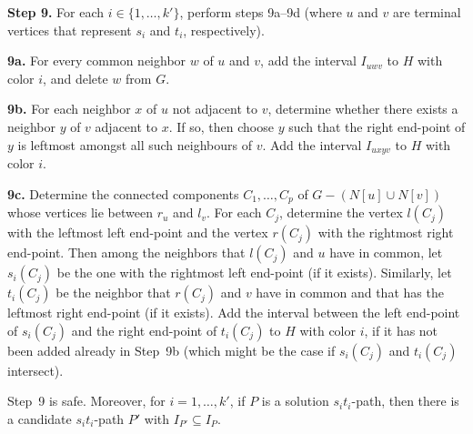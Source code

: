 \documentclass{llncs}
\begin{document}
\medskip
\noindent
{\bf Step 9.} For each $i\in\{1,\ldots,k'\}$, perform steps 9a--9d (where $u$ and $v$ are terminal vertices that represent $s_i$ and $t_i$, respectively).

\medskip
\noindent
{\bf 9a.} For every common neighbor $w$ of $u$ and $v$, add the interval $I_{uwv}$ to $H$ with color $i$, and delete $w$ from $G$.

\medskip
\noindent
{\bf 9b.} For each neighbor $x$ of $u$ not adjacent to $v$, determine whether there exists a neighbor $y$ of $v$ adjacent to $x$.
If so, then choose $y$ such that the right end-point of $y$ is leftmost amongst all such neighbours of $v$.
Add the interval $I_{uxyv}$ to $H$ with color $i$.

\medskip
\noindent
{\bf 9c.}
Determine the connected components $C_{1},\ldots,C_{p}$ of $G - (N[u] \cup N[v])$ whose vertices lie between $r_{u}$ and $l_{v}$.
For each $C_{j}$, determine the vertex $l(C_{j})$ with the leftmost left end-point and the vertex $r(C_{j})$ with the rightmost right end-point. Then among the neighbors that $l(C_{j})$ and $u$ have in common,
let $s_{i}(C_{j})$ be the one with the rightmost left end-point (if it exists). Similarly, let $t_{i}(C_{j})$ be the neighbor that $r(C_{j})$ and $v$ have in common and that has the leftmost right end-point (if it exists). 
Add the interval between the left end-point of $s_{i}(C_{j})$ and the right end-point of $t_{i}(C_{j})$ to $H$ with color $i$, if it has not been
added already in Step~9b (which might be the case if $s_i(C_j)$ and $t_i(C_j)$ intersect).

\begin{lemma}\label{l-9}
Step~9 is safe. Moreover, for $i=1,\ldots,k'$, if $P$ is a solution $s_it_i$-path, then there is a candidate $s_it_i$-path $P'$ with $I_{P'} \subseteq I_{P}$.
\end{lemma}
\end{document}
